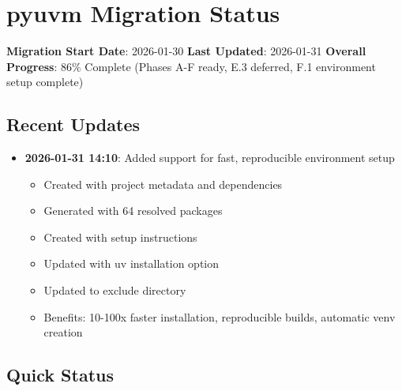 \section{pyuvm Migration Status}\label{cr:status:pyuvm-migration}

\begin{record}

\textbf{Migration Start Date}: 2026-01-30 \textbf{Last Updated}:
2026-01-31 \textbf{Overall Progress}: 86\% Complete (Phases A-F ready,
E.3 deferred, F.1 environment setup complete)

\end{record}

\subsection{Recent Updates}\label{cr:status:pyuvm-migration:recent-updates}

\begin{record}

\begin{itemize}
\tightlist
\item
  \textbf{2026-01-31 14:10}: Added  support for fast,
  reproducible environment setup

  \begin{itemize}
  \tightlist
  \item
    Created  with project metadata and dependencies
  \item
    Generated  with 64 resolved packages
  \item
    Created  with setup instructions
  \item
    Updated  with uv installation option
  \item
    Updated  to exclude  directory
  \item
    Benefits: 10-100x faster installation, reproducible builds,
    automatic venv creation
  \end{itemize}
\end{itemize}

\end{record}

\subsection{Quick Status}\label{cr:status:pyuvm-migration:quick-status}

